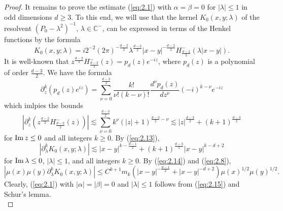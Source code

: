 \documentclass[11pt]{amsart}
\numberwithin{equation}{section}
\begin{document}
\begin{proof}
 It remains to prove the estimate (\ref{eq:2.1}) with $\alpha=\beta=0$ for $|\lambda|\le 1$ in odd dimensions $d\ge 3$. To this end, we will use
 that the kernel $K_0(x,y;\lambda)$ of the resolvent $(P_0-\lambda^2)^{-1}$, $\lambda\in\mathbb{C}^-$,
can be expressed in terms of the Henkel functions by the formula
\begin{equation*}
K_0(x,y;\lambda)=i2^{-2}(2\pi)^{-\frac{d-2}{2}}\lambda^{\frac{d-2}{2}}|x-y|^{-\frac{d-2}{2}}H^-_{\frac{d-2}{2}}(\lambda|x-y|).
\end{equation*}
It is well-known that $z^{\frac{d-2}{2}}H^-_{\frac{d-2}{2}}(z)=p_d(z)e^{-iz}$, where $p_d(z)$ is a polynomial of order
 $\frac{d-3}{2}$. We have the formula
  \begin{equation*}
  \partial_z^k(p_d(z)e^{iz})=\sum_{\nu=0}^{\frac{d-3}{2}}\frac{k!}{\nu!(k-\nu)!}\frac{d^\nu p_d(z)}{dz^\nu}(-i)^{k-\nu}e^{-iz}
 \end{equation*}
 which imlpies the bounds 
\begin{equation}\label{eq:2.13}
\left|\partial_z^k\left(z^{\frac{d-2}{2}}H^-_{\frac{d-2}{2}}(z)\right)\right|\lesssim 
\sum_{\nu=0}^{\frac{d-3}{2}}k^\nu(|z|+1)^{\frac{d-3}{2}-\nu}\lesssim |z|^{\frac{d-3}{2}}+(k+1)^{\frac{d-3}{2}}
\end{equation}
 for ${\rm Im}\,z\le 0$ and all integers $k\ge 0$. By (\ref{eq:2.13}),
 \begin{equation}\label{eq:2.14}
\left|\partial_\lambda^kK_0(x,y;\lambda)\right|\lesssim|x-y|^{k-\frac{d-1}{2}}+(k+1)^{\frac{d-3}{2}}|x-y|^{k-d+2}
\end{equation}
 for ${\rm Im}\,\lambda\le 0$, $|\lambda|\le 1$, and all integers $k\ge 0$. By (\ref{eq:2.14}) and (\ref{eq:2.8}),
 \begin{equation}\label{eq:2.15}
\left|\mu(x)\mu(y)\partial_\lambda^kK_0(x,y;\lambda)\right|\le C^{k+1}m_k\left(|x-y|^{-\frac{d-1}{2}}+|x-y|^{-d+2}\right)
\mu(x)^{1/2}\mu(y)^{1/2}.
\end{equation}
 Clearly, (\ref{eq:2.1}) with $|\alpha| = |\beta| = 0$ and $|\lambda|\le 1$ 
 follows from (\ref{eq:2.15}) and Schur's lemma. \\
 \end{proof}
 
\end{document}
